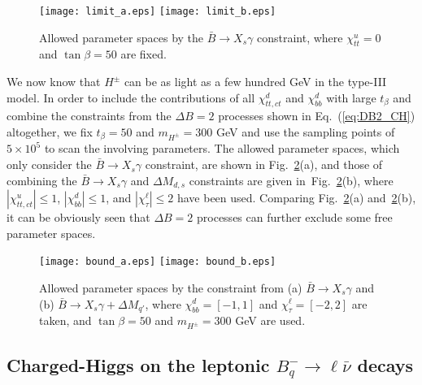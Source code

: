 \documentclass[prd,preprint,superscriptaddress,amsmath,amssymb]{revtex4}
\begin{document}
\begin{figure}[phtb]
\texttt{[image: limit\_a.eps]}
\texttt{[image: limit\_b.eps]}
\caption{  Allowed parameter spaces by the $\bar B \to X_s \gamma$ constraint, where $\chi^u_{tt}=0$ and $\tan\beta=50$ are fixed.}
\label{fig:limit_ab}
\end{figure} 
  
 We now know that $H^\pm$ can be as light as a few hundred GeV in the type-III model. In order to include the contributions of all $\chi^d_{tt,ct}$ and $\chi^d_{bb}$ with large $t_\beta$ and combine the constraints from  the $\Delta B=2$ processes shown in Eq.~(\ref{eq:DB2_CH}) altogether,  we fix $t_\beta=50$ and $m_{H^\pm}=300$ GeV and use the sampling points of $5\times 10^{5}$ to scan the involving parameters. The allowed parameter spaces, which only consider the $\bar B\to X_s \gamma$ constraint, are shown in Fig.~\ref{fig:bound_ab}(a), and  those  of combining the $\bar B\to X_s \gamma$ and $\Delta M_{d,s}$ constraints are given in~Fig.~\ref{fig:bound_ab}(b), where  $|\chi^u_{tt,ct}|\leq 1$, $|\chi^d_{bb}|\leq 1$, and $|\chi^\ell_\tau|\leq 2$ have been used. Comparing Fig.~\ref{fig:bound_ab}(a) and~\ref{fig:bound_ab}(b), it can be obviously seen that $\Delta B=2$ processes can further exclude some free parameter spaces. 
  
\begin{figure}[phtb]
\texttt{[image: bound\_a.eps]}
\texttt{[image: bound\_b.eps]}

\caption{  Allowed parameter spaces by the constraint  from (a) $\bar B\to X_s \gamma$ and (b) $\bar B\to X_s \gamma + \Delta M_{q'}$, where $\chi^d_{bb}=[-1,1]$ and $\chi^{\ell}_{\tau}=[-2,2]$ are taken, and $\tan\beta=50$ and  $m_{H^\pm}=300$ GeV are used.}
\label{fig:bound_ab}
\end{figure} 
  
  
  \subsection{ Charged-Higgs on the leptonic $ B^-_q \to \ell \bar \nu$ decays}
  
\end{document}
